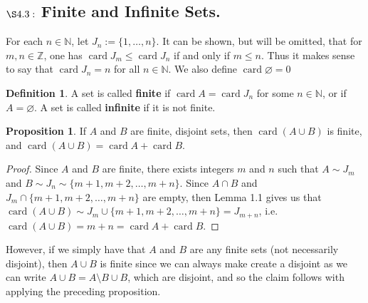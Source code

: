 \documentclass[9pt,reqno]{amsart}
\theoremstyle{definition}
\newtheorem{defi}{Definition}[section]
\newtheorem{prop}{Proposition}[section]
\newcommand{\nn}{\mathbb N}
\newcommand{\zz}{\mathbb Z}
\DeclareMathOperator{\card}{card}
\begin{document}
\subsection{$\S 4.3:$ Finite and Infinite Sets.} For each $n \in \nn$, let $J_n := \{1, \ldots, n \}$. It can be shown, but will be omitted, that for $m, n \in \zz$, one has $\card J_m \leq \card J_n$ if and only if $m \leq n$. Thus it makes sense to say that $\card J_n = n$ for all $n \in \nn$. We also define $\card \varnothing = 0$
\begin{defi}
A set is called \textbf{finite}	if $\card A = \card J_n$ for some $n \in \nn$, or if $A = \varnothing$. A set is called \textbf{infinite} if it is not finite.
\end{defi}
\begin{prop}
If $A$ and $B$ are finite, disjoint sets, then $\card (A\cup B)$ is finite, and $\card (A\cup B) = \card A + \card B$.	
\end{prop}
\begin{proof}
	Since $A$ and $B$ are finite, there exists integers $m$ and $n$ such that $A \sim J_m$ and $B \sim J_n \sim \{m+1, m+2, \ldots, m+n \}$. Since $A \cap B$ and $J_m \cap \{m+1, m+2, \ldots, m +n \}$ are empty, then Lemma 1.1 gives us that $\card (A \cup B) \sim J_m \cup \{m+1, m+2, \ldots, m+n \} = J_{m+n}$, i.e. $\card (A\cup B) = m+n = \card A + \card B$. 
\end{proof}
However, if we simply have that $A$ and $B$ are any finite sets (not necessarily disjoint), then $A \cup B$ is finite since we can always make create a disjoint as we can write $A \cup B = A \setminus B \cup B $, which are disjoint, and so the claim follows with applying the preceding proposition.
\end{document}
